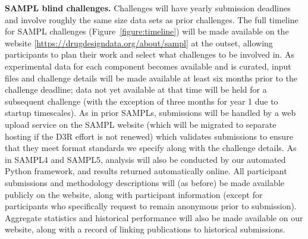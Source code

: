 \documentclass[11pt]{article}
\begin{document}
{\bf SAMPL blind challenges.} Challenges will have yearly submission deadlines and involve roughly the same size data sets as prior challenges.
The full timeline for SAMPL challenges (Figure~\ref{figure:timeline}) will be made available on the website [\url{https://drugdesigndata.org/about/sampl}] at the outset, allowing participants to plan their work and select what challenges to be involved in.
As experimental data for each component becomes available and is curated, input files and challenge details will be made available at least six months prior to the challenge deadline; data not yet available at that time will be held for a subsequent challenge (with the exception of three months for year 1 due to startup timescales).
As in prior SAMPLs, submissions will be handled by a web upload service on the SAMPL website (which will be migrated to separate hosting if the D3R effort is not renewed) which validates submissions to ensure that they meet format standards we specify along with the challenge details. 
As in SAMPL4 and SAMPL5, analysis will also be conducted by our automated Python framework, and results returned automatically online.
All participant submissions and methodology descriptions will (as before) be made available publicly on the website, along with participant information (except for participants who specifically request to remain anonymous prior to submission).
Aggregate statistics and historical performance will also be made available on our website, along with a record of linking publications to historical submissions.
\end{document}
